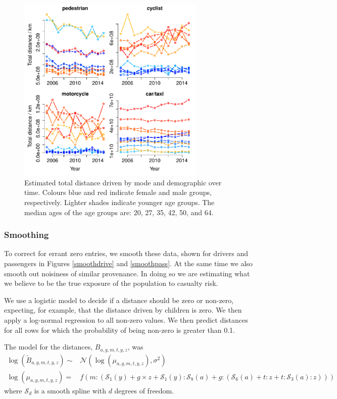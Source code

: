 \documentclass{article}
\begin{document}
\begin{figure}[H]
\centering
\includegraphics[width=0.8\textwidth]{NTStrajectoriesperson.pdf}
\caption{\small Estimated total distance driven by mode and demographic over time. Colours blue and red indicate female and male groups, respectively. Lighter shades indicate younger age groups. The median ages of the age groups are: 20, 27, 35, 42, 50, and 64.}
\label{NTStrajectoriesperson}
\end{figure}

\subsubsection{Smoothing}\label{smooth}

To correct for errant zero entries, we smooth these data, shown for drivers and passengers in Figures \ref{smoothdrive} and \ref{smoothpass}. At the same time we also smooth out noisiness of similar provenance. In doing so we are estimating what we believe to be the true exposure of the population to casualty risk.

We use a logistic model to decide if a distance should be zero or non-zero, expecting, for example, that the distance driven by children is zero. We then apply a log-normal regression to all non-zero values. We then predict distances for all rows for which the probability of being non-zero is greater than 0.1.

The model for the distances, $B_{a,g,m,t,y,z}$, was
\begin{align}
\log(\tilde{B}_{a,g,m,t,y,z}) \sim & \mathcal{N}(\log(\mu_{a,g,m,t,y,z}),\sigma^2)\label{smoothEq}\\
\log(\mu_{a,g,m,t,y,z}) =& f(m:(\mathcal{S}_1(y)+g\times z+\mathcal{S}_1(y):\mathcal{S}_8(a)+g:(\mathcal{S}_6(a)+t:z+t:\mathcal{S}_3(a):z)))
\end{align}
where $\mathcal{S}_d$ is a smooth spline with $d$ degrees of freedom.
\end{document}
